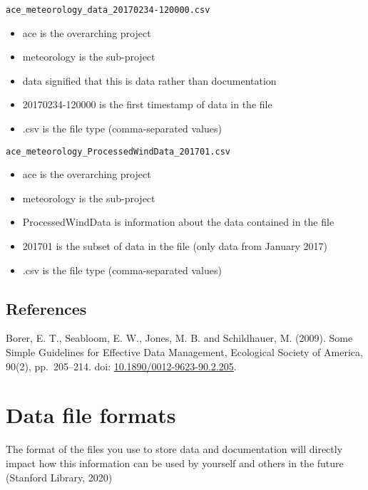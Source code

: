 \documentclass[12pt,a4paper,oneside]{report}
\providecommand{\tightlist}{%
  \setlength{\itemsep}{0pt}\setlength{\parskip}{0pt}}
\begin{document}
\begin{verbatim}
ace_meteorology_data_20170234-120000.csv
\end{verbatim}

\begin{itemize}
\tightlist
\item
  ace is the overarching project
\item
  meteorology is the sub-project
\item
  data signified that this is data rather than documentation
\item
  20170234-120000 is the first timestamp of data in the file
\item
  .csv is the file type (comma-separated values)
\end{itemize}

\begin{verbatim}
ace_meteorology_ProcessedWindData_201701.csv
\end{verbatim}

\begin{itemize}
\tightlist
\item
  ace is the overarching project
\item
  meteorology is the sub-project
\item
  ProcessedWindData is information about the data contained in the file
\item
  201701 is the subset of data in the file (only data from January 2017)
\item
  .csv is the file type (comma-separated values)
\end{itemize}

\hypertarget{references-2}{%
\section{References}\label{references-2}}

Borer, E. T., Seabloom, E. W., Jones, M. B. and Schildhauer, M. (2009).
Some Simple Guidelines for Effective Data Management, Ecological Society
of America, 90(2), pp.~205--214. doi:
\href{https://doi.org/10.1890/0012-9623-90.2.205}{10.1890/0012-9623-90.2.205}.

\hypertarget{data-file-formats}{%
\chapter{Data file formats}\label{data-file-formats}}

The format of the files you use to store data and documentation will
directly impact how this information can be used by yourself and others
in the future (Stanford Library, 2020)
\end{document}
